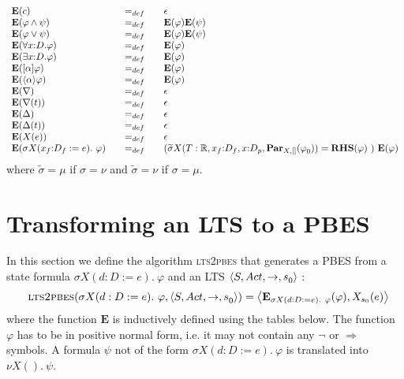 \documentclass{article}
\begin{document}
\begin{equation*}
\begin{array}{lll}
{\mathbf{E}}(c) & =_{def} & \epsilon \\ 
{\mathbf{E}}(\varphi \wedge \psi ) & =_{def} & {\mathbf{E}}(\varphi ){%
\mathbf{E}}(\psi ) \\ 
{\mathbf{E}}(\varphi \vee \psi ) & =_{def} & {\mathbf{E}}(\varphi ){\mathbf{E%
}}(\psi ) \\ 
{\mathbf{E}}(\forall {x{:}D}.\varphi ) & =_{def} & {\mathbf{E}}(\varphi ) \\ 
{\mathbf{E}}(\exists {x{:}D}.\varphi ) & =_{def} & {\mathbf{E}}(\varphi ) \\ 
{\mathbf{E}}([\alpha ]\varphi ) & =_{def} & {\mathbf{E}}(\varphi ) \\ 
{\mathbf{E}}(\langle \alpha \rangle \varphi ) & =_{def} & {\mathbf{E}}%
(\varphi ) \\ 
{\mathbf{E}}(\nabla ) & =_{def} & \epsilon \\ 
{\mathbf{E}}(\nabla (t)) & =_{def} & \epsilon \\ 
{\mathbf{E}}(\Delta ) & =_{def} & \epsilon \\ 
{\mathbf{E}}(\Delta (t)) & =_{def} & \epsilon \\ 
{\mathbf{E}}(X(e)) & =_{def} & \epsilon \\ 
{\mathbf{E}}(\sigma X(x_{f}{:}D_{f}:=e).~\varphi )~~~ & =_{def}~~~ & (%
\widetilde{\sigma }X(T:\mathbb{R},x_{f}{:}D_{f},x{:}D_{p},\mathbf{Par}%
_{X,[]}(\varphi _{0}))={\mathbf{RHS}}(\varphi )~)~{\mathbf{E}}(\varphi )%
\end{array}%
\end{equation*}%
where $\widetilde{\sigma }=\mu $ if $\sigma =\nu $ and $\widetilde{\sigma }%
=\nu $ if $\sigma =\mu $.

\newpage

\section{Transforming an LTS to a PBES}

In this section we define the algorithm \textsc{lts2pbes} that generates a
PBES from a state formula $\sigma X(d:D:=e).~\varphi $ and an LTS $\langle {%
S,Act,\rightarrow ,s}_{0}\rangle $ : 
\begin{equation*}
\text{\textsc{lts2pbes}}(\sigma X(d:D:=e).~\varphi ,\langle {%
S,Act,\rightarrow ,s}_{0}\rangle )=\left\langle \mathbf{E}_{\sigma
X(d:D:=e).~\varphi }(\varphi ),X_{s_{0}}(e)\right\rangle
\end{equation*}%
where the function $\mathbf{E}$ is inductively defined using the tables
below. The function $\varphi $ has to be in positive normal form, i.e. it
may not contain any $\lnot $ or $\Rightarrow $ symbols. A formula $\psi $
not of the form $\sigma X(d:D:=e).~\varphi $ is translated into $\nu
X().~\psi $.
\end{document}
